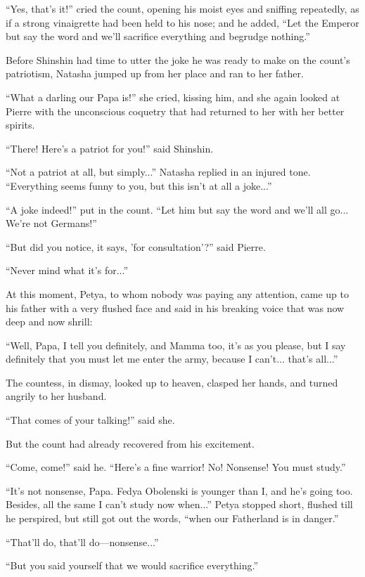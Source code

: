 ``Yes, that's it!'' cried the count, opening his moist eyes and
sniffing repeatedly, as if a strong vinaigrette had been held to
his nose; and he added, ``Let the Emperor but say the word and
we'll sacrifice everything and begrudge nothing.''

Before Shinshin had time to utter the joke he was ready to make
on the count's patriotism, Natasha jumped up from her place and
ran to her father.

``What a darling our Papa is!'' she cried, kissing him, and she
again looked at Pierre with the unconscious coquetry that had
returned to her with her better spirits.

``There! Here's a patriot for you!'' said Shinshin.

``Not a patriot at all, but simply...'' Natasha replied in an
injured tone. ``Everything seems funny to you, but this isn't at
all a joke...''

``A joke indeed!'' put in the count. ``Let him but say the word
and we'll all go... We're not Germans!''

``But did you notice, it says, 'for consultation'?'' said Pierre.

``Never mind what it's for...''

At this moment, Petya, to whom nobody was paying any attention,
came up to his father with a very flushed face and said in his
breaking voice that was now deep and now shrill:

``Well, Papa, I tell you definitely, and Mamma too, it's as you
please, but I say definitely that you must let me enter the army,
because I can't... that's all...''

The countess, in dismay, looked up to heaven, clasped her hands,
and turned angrily to her husband.

``That comes of your talking!'' said she.

But the count had already recovered from his excitement.

``Come, come!'' said he. ``Here's a fine warrior! No! Nonsense!
You must study.''

``It's not nonsense, Papa. Fedya Obolenski is younger than I, and
he's going too. Besides, all the same I can't study now when...''
Petya stopped short, flushed till he perspired, but still got out
the words, ``when our Fatherland is in danger.''

``That'll do, that'll do---nonsense...''

``But you said yourself that we would sacrifice everything.''

